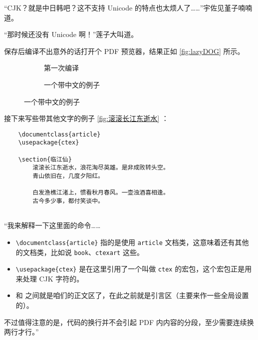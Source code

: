 “CJK？就是中日韩吧？这不支持 Unicode 的特点也太烦人了……”宇佐见堇子喃喃道。

“那时候还没有 Unicode 啊！”莲子大叫道。

保存后编译不出意外的话打开个 PDF 预览器，结果正如 \autoref{fig:lazyDOG} 所示。

\begin{figure}[t]
    \centering
    \begin{subfigure}[t]{0.4\textwidth} \centering
        \caption{第一次编译}
        \label{fig:lazyDOG}
    \end{subfigure}\quad
    \begin{subfigure}[t]{0.4\textwidth} \centering
        \caption{一个带中文的例子}
        \label{fig:滚滚长江东逝水}
    \end{subfigure}
\end{figure}

接下来写些带其他文字的例子 \autoref{fig:滚滚长江东逝水} ：


\begin{lstlisting}
    \documentclass{article}
    \usepackage{ctex}
    
    \section{临江仙}
        滚滚长江东逝水，浪花淘尽英雄。是非成败转头空。
        青山依旧在，几度夕阳红。

        白发渔樵江渚上，惯看秋月春风。一壶浊酒喜相逢。
        古今多少事，都付笑谈中。    
    
\end{lstlisting}


“我来解释一下这里面的命令……

\begin{itemize}
    \item \verb"\documentclass{article}" 指的是使用 \verb"article" 文档类，这意味着还有其他的文档类，比如说 \verb"book"、\verb"ctexart" 这些。
    \item \verb"\usepackage{ctex}" 是在这里引用了一个叫做 \verb"ctex" 的宏包，这个宏包正是用来处理 CJK 字符的。
    \item \verb"" 和 \verb"" 之间就是咱们的正文区了，在此之前就是引言区（主要来作一些全局设置的）。
\end{itemize}

不过值得注意的是，代码的换行并不会引起 PDF 内内容的分段，至少需要连续换两行才行。”

